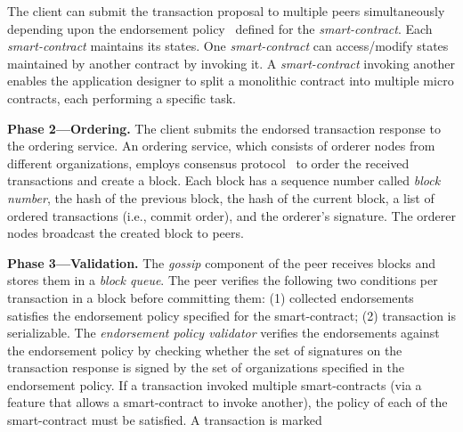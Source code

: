 The client can submit the
transaction proposal to multiple peers simultaneously depending upon the
endorsement policy~\cite{endorsement1}
defined for the \textit{smart-contract}.
Each \textit{smart-contract} maintains its states. One \textit{smart-contract}
can access/modify states maintained by another contract by invoking it. A
\textit{smart-contract} invoking another enables the application designer
to split a monolithic contract into multiple micro contracts,
each performing a specific task.
\par
\textbf{Phase 2---Ordering.} 
The client submits the endorsed transaction response to the ordering
service. An ordering service, which consists of orderer nodes from different
organizations, employs consensus protocol~\cite{raft} to order the received
transactions and create a block. Each block has a sequence number called
\textit{block number}, the hash of the previous block, the hash of the current block,
a list of ordered transactions (i.e., commit order), and the orderer's
signature. The orderer nodes broadcast the created block to peers.
\par
\textbf{Phase 3---Validation.} The \textit{gossip} component of the peer
receives blocks and stores them in a \textit{block queue}. The peer 
verifies the following two conditions per transaction in a block before committing
them: (1) collected
endorsements satisfies the endorsement policy specified for the smart-contract;
(2) transaction is serializable. The \textit{endorsement policy validator} verifies
the endorsements against the endorsement policy by checking whether the set of
signatures on the transaction response is signed by the set of organizations
specified in the endorsement policy. If a transaction invoked multiple smart-contracts
(via a feature that allows a smart-contract to invoke another),
the policy of each of the smart-contract must be satisfied. A transaction is marked
